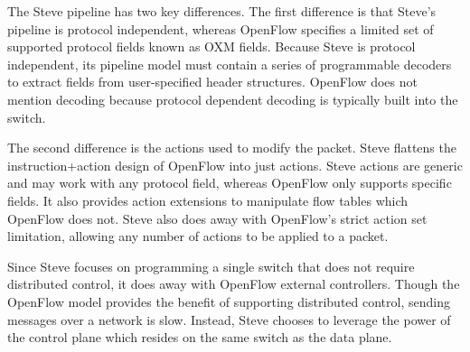 The Steve pipeline has two key differences.
The first difference is that
Steve's pipeline is protocol independent, whereas OpenFlow specifies a limited set of
supported protocol fields known as OXM fields.
Because Steve is protocol independent, its
pipeline model must contain a series of programmable decoders to extract fields
from user-specified header structures. 
OpenFlow does not mention decoding because
protocol dependent decoding is typically built into the switch.

The second difference is the actions used to modify the packet.
Steve flattens the instruction+action design of OpenFlow into
just actions. Steve actions are generic and may work with any protocol field, whereas OpenFlow only supports specific fields. It also provides action extensions to manipulate flow tables
which OpenFlow does not.
Steve also does away with OpenFlow's strict action set limitation, allowing any number of actions to be applied to a packet.

Since Steve focuses on programming a single switch that does not require distributed control, it does away with OpenFlow external controllers. 
Though the OpenFlow model provides
the benefit of supporting distributed control, sending messages
over a network is slow.
Instead, Steve chooses to leverage the power of the control plane which
resides on the same switch as the data plane.


%


